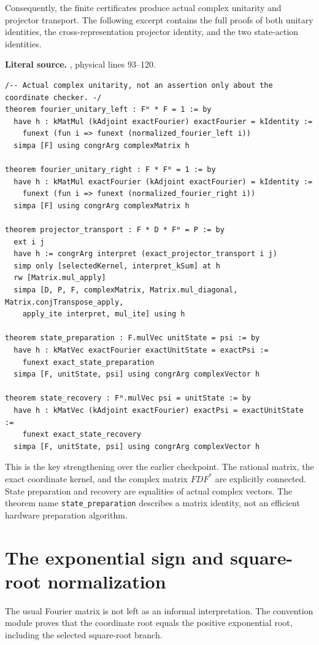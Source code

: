 Consequently, the finite certificates produce actual complex unitarity and
projector transport. The following excerpt contains the full proofs of both
unitary identities, the cross-representation projector identity, and the two
state-action identities.

\noindent\textbf{Literal source.} \texttt{}, physical lines 93--120.

\begin{Verbatim}[breaklines=true,breakanywhere=true,fontsize=\footnotesize]
/-- Actual complex unitarity, not an assertion only about the coordinate checker. -/
theorem fourier_unitary_left : Fᴴ * F = 1 := by
  have h : kMatMul (kAdjoint exactFourier) exactFourier = kIdentity :=
    funext (fun i => funext (normalized_fourier_left i))
  simpa [F] using congrArg complexMatrix h

theorem fourier_unitary_right : F * Fᴴ = 1 := by
  have h : kMatMul exactFourier (kAdjoint exactFourier) = kIdentity :=
    funext (fun i => funext (normalized_fourier_right i))
  simpa [F] using congrArg complexMatrix h

theorem projector_transport : F * D * Fᴴ = P := by
  ext i j
  have h := congrArg interpret (exact_projector_transport i j)
  simp only [selectedKernel, interpret_kSum] at h
  rw [Matrix.mul_apply]
  simpa [D, P, F, complexMatrix, Matrix.mul_diagonal, Matrix.conjTranspose_apply,
    apply_ite interpret, mul_ite] using h

theorem state_preparation : F.mulVec unitState = psi := by
  have h : kMatVec exactFourier exactUnitState = exactPsi :=
    funext exact_state_preparation
  simpa [F, unitState, psi] using congrArg complexVector h

theorem state_recovery : Fᴴ.mulVec psi = unitState := by
  have h : kMatVec (kAdjoint exactFourier) exactPsi = exactUnitState :=
    funext exact_state_recovery
  simpa [F, unitState, psi] using congrArg complexVector h
\end{Verbatim}

This is the key strengthening over the earlier checkpoint. The rational matrix,
the exact coordinate kernel, and the complex matrix \(FDF^*\) are explicitly
connected. State preparation and recovery are equalities of actual complex
vectors. The theorem name \texttt{state\_preparation} describes a matrix identity,
not an efficient hardware preparation algorithm.

\section{The exponential sign and square-root normalization}
The usual Fourier matrix is not left as an informal interpretation. The
convention module proves that the coordinate root equals the positive
exponential root, including the selected square-root branch.


